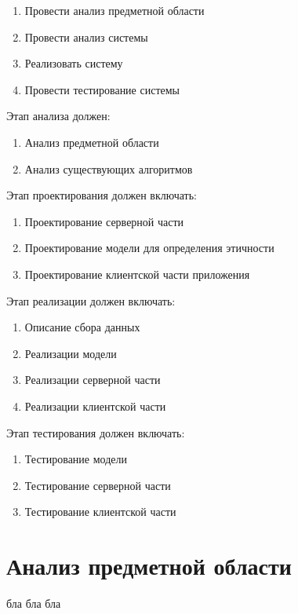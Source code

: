 \documentclass[PI, VKR]{HSEUniversity}
\begin{document}
\begin{enumerate}
\item Провести анализ предметной области
\item Провести анализ системы
\item Реализовать систему
\item Провести тестирование системы
\end{enumerate}

Этап анализа должен:
\begin{enumerate}
\item Анализ предметной области
\item Анализ существующих алгоритмов
\end{enumerate}

Этап проектирования должен включать:
\begin{enumerate}
\item Проектирование серверной части
\item Проектирование модели для определения этичности
\item Проектирование клиентской части приложения
\end{enumerate}

Этап реализации должен включать:
\begin{enumerate}
\item Описание сбора данных
\item Реализации модели
\item Реализации серверной части
\item Реализации клиентской части
\end{enumerate}

Этап тестирования должен включать:
\begin{enumerate}
\item Тестирование модели
\item Тестирование серверной части
\item Тестирование клиентской части
\end{enumerate}
\chapter{Анализ предметной области}
\label{sec:orgab43770}
бла бла бла
\end{document}
